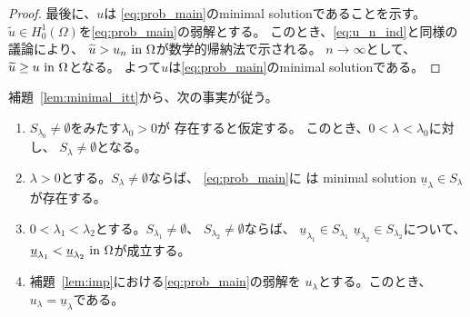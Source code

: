 \begin{proof}
 最後に、$u$は
 \ref{eq:prob_main}のminimal solutionであることを示す。
 $\tilde{u} \in H_0^1(\Omega)$を\ref{eq:prob_main}の弱解とする。
 このとき、\eqref{eq:u_n_ind}と同様の議論により、
 $\widetilde{u} > u_n ~\text{in}~ \Omega$が数学的帰納法で示される。
 $n \to \infty$として、$\widetilde{u} \geq u ~\text{in}~ \Omega$となる。
 よって$u$は\ref{eq:prob_main}のminimal solutionである。\qedhere
\end{proof}

補題~\ref{lem:minimal_itt}から、次の事実が従う。

\begin{lem} \label{lem:minimal_va}
 \begin{enumerate}[1.] \sage
  \item $S_{\lambda_0} \neq \emptyset$をみたす$\lambda_0 > 0$が
        存在すると仮定する。
        このとき、$0 < \lambda < \lambda_0$に対し、
        $S_\lambda \neq \emptyset$となる。
  \item $\lambda > 0$とする。$S_\lambda \neq \emptyset$ならば、
        \ref{eq:prob_main}に
        は minimal solution $\underline{u}_\lambda
        \in S_\lambda$が存在する。
  \item $0 < \lambda_1 < \lambda_2$とする。$S_{\lambda_1} \neq
        \emptyset$、
        $S_{\lambda_2} \neq \emptyset$ならば、
        $\underline{u}_{\lambda_1} \in S_{\lambda_1}$
        $\underline{u}_{\lambda_2} \in S_{\lambda_2}$について、
        $\underline{u}_{\lambda_1} < \underline{u}_{\lambda_2} ~\text{in}~
        \Omega$が成立する。
  \item 補題~\ref{lem:imp}における\ref{eq:prob_main}の弱解を
        $u_\lambda$とする。このとき、$u_\lambda =
        \underline{u}_\lambda$である。
 \end{enumerate}
\end{lem}

